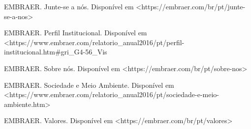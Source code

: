 \documentclass[
    12pt,               %
    openright,          %
    oneside,
    a4paper,            %
    draft,              %
    MODELO,             %
    TODO,               %
    english,            %
    brazil              %
    ]{ifsp-spo-inf-ctds}
\begin{document}
EMBRAER. Junte-se a nós. Disponível em <https://embraer.com/br/pt/junte-se-a-nos>

EMBRAER. Perfil Institucional. Disponível em <https://www.embraer.com/relatorio_anual2016/pt/perfil-institucional.htm#gri_G4-56_Vis%

EMBRAER. Sobre nós. Disponível em <https://embraer.com/br/pt/sobre-nos> 

EMBRAER. Sociedade e Meio Ambiente. Disponível em <https://www.embraer.com/relatorio_anual2016/pt/sociedade-e-meio-ambiente.htm>

EMBRAER. Valores. Disponível em <https://embraer.com/br/pt/valores>








\end{document}

